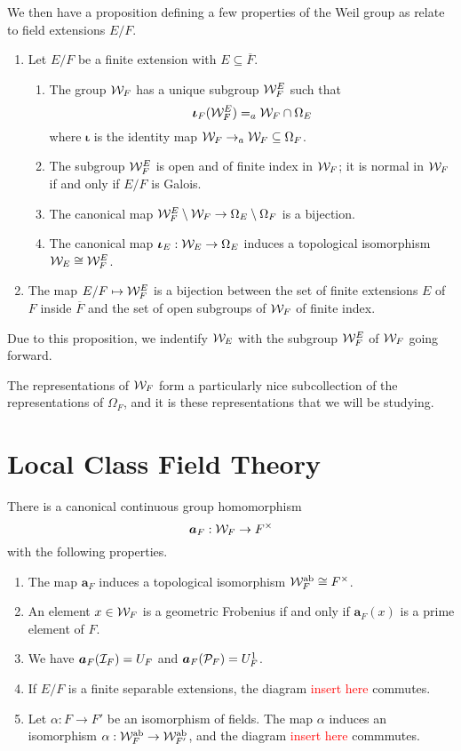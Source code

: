 We then have a proposition defining a few properties of the Weil group as relate to field extensions $E/F$.
\begin{prop}
  \begin{enumerate}
    \item Let $E/F$ be a finite extension with $E \subseteq \overline{F}$.
    \begin{enumerate}
      \item The group $\mathcal{W}_F$ has a unique subgroup $\mathcal{W}^E_F$ such that \[\bm{\iota}_F(\mathcal{W}^E_F) = _a\mathcal{W}_F \cap \Omega_E\] where $\bm{\iota}$ is the identity map $\mathcal{W}_F \to _a\mathcal{W}_F \subseteq \Omega_F$.
      \item The subgroup $\mathcal{W}^E_F$ is open and of finite index in $\mathcal{W}_F$; it is normal in $\mathcal{W}_F$ if and only if $E/F$ is Galois.
      \item The canonical map $\mathcal{W}^E_F\setminus \mathcal{W}_F \to \Omega_E \setminus \Omega_F$ is a bijection.
      \item The canonical map $\bm{\iota}_E : \mathcal{W}_E \to \Omega_E$ induces a topological isomorphism $\mathcal{W}_E \cong \mathcal{W}^E_F$.
    \end{enumerate}
    \item The map $E/F \mapsto \mathcal{W}^E_F$ is a bijection between the set of finite extensions $E$ of $F$ inside $\overline{F}$ and the set of open subgroups of $\mathcal{W}_F$ of finite index.
  \end{enumerate}
\end{prop}

Due to this proposition, we indentify $\mathcal{W}_E$ with the subgroup $\mathcal{W}^E_F$ of $\mathcal{W}_F$ going forward.



The representations of $\mathcal{W}_F$ form a particularly nice subcollection of the representations of $\Omega_F$, and it is these representations that we will be studying.
\section{Local Class Field Theory}
\label{thm:LCFT}
\begin{theorem}
  There is a canonical continuous group homomorphism
  \[\bm{a}_F : \mathcal{W}_F \to F^\times\]
  with the following properties.
  \begin{enumerate}
    \item The map $\bm{a}_F$ induces a topological isomorphism $\mathcal{W}_F^{\text{ab}} \cong F^\times$.
    \item An element $x \in \mathcal{W}_F$ is a geometric Frobenius if and only if $\bm{a}_F(x)$ is a prime element of $F$.
    \item We have $\bm{a}_F(\mathcal{I}_F) = U_F$ and $\bm{a}_F(\mathcal{P}_F) = U^1_F$.
    \item If $E/F$ is a finite separable extensions, the diagram \textcolor{red}{insert here} commutes.
    \item Let $\alpha : F \to F'$ be an isomorphism of fields. The map $\alpha$ induces an isomorphism $\alpha: \mathcal{W}^{\text{ab}}_F \to \mathcal{W}^{\text{ab}}_{F'}$, and the diagram \textcolor{red}{insert here} commmutes.
  \end{enumerate}
\end{theorem}


